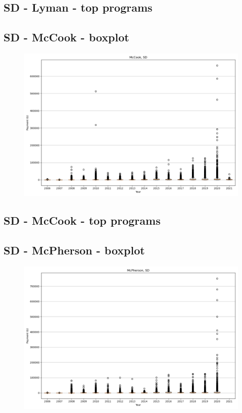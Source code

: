 \subsection*{SD - Lyman - top programs}

\newpage
\subsection*{SD - McCook - boxplot}
\begin{figure}[h]
\centering
\includegraphics[width=7in]{../output/boxplots/counties/McCook-SD_boxplot.png}
\end{figure}


\subsection*{SD - McCook - top programs}

\newpage
\subsection*{SD - McPherson - boxplot}
\begin{figure}[h]
\centering
\includegraphics[width=7in]{../output/boxplots/counties/McPherson-SD_boxplot.png}
\end{figure}


